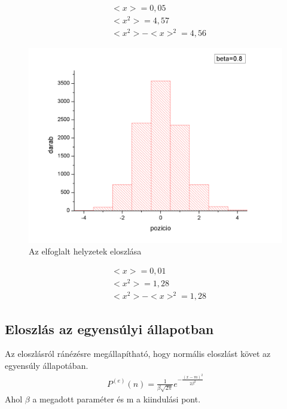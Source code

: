 \documentclass[paper=a4, fontsize=11pt]{article}
\begin{document}
\begin{align}
&<x>= 0,05\\
&<x^2>=4,57\\
&<x^2>-<x>^2=4,56
\end{align}


\begin{figure}[H]
\includegraphics[width=\textwidth]{4.png}
\caption{Az elfoglalt helyzetek eloszlása}
\end{figure}


\begin{align}
&<x>= 0,01\\
&<x^2>=1,28\\
&<x^2>-<x>^2=1,28
\end{align}


\subsection{Eloszlás az egyensúlyi állapotban}
Az eloszlásról ránézésre megállapítható, hogy normális eloszlást követ az egyensúly állapotában.
\begin{align}
P^{(e)}(n)=\frac{1}{\beta \sqrt{2\pi}}e^{-\frac{(x-m)^2}{2 \beta^2}}
\end{align}
Ahol $\beta$ a megadott paraméter és m a kiindulási pont.
\end{document}
